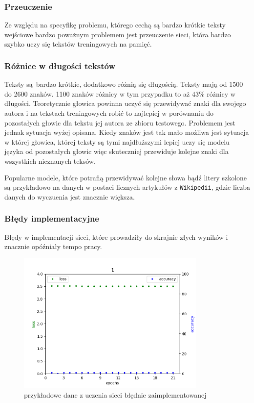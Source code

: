 \subsubsection{Przeuczenie}
Ze względu na specyfikę problemu, którego cechą są bardzo krótkie teksty wejściowe bardzo poważnym 
problemem jest przeuczenie sieci, która
bardzo szybko uczy się tekstów treningowych na pamięć. 

\subsubsection{Różnice w długości tekstów}
Teksty są bardzo krótkie, dodatkowo różnią się długością. Teksty mają od 1500 do 2600 znaków. 1100 znaków 
różnicy w tym przypadku to aż $43\%$ różnicy w długości. Teoretycznie głowica powinna uczyć się przewidywać znaki dla 
swojego autora i na tekstach treningowych robić to najlepiej w porównaniu do pozostałych głowic dla tekstu 
jej autora ze zbioru testowego. Problemem jest jednak sytuacja wyżej opisana. Kiedy znaków jest tak mało 
możliwa jest sytuacja w której głowica, której teksty są tymi najdłuższymi lepiej uczy się modelu języka od
pozostałych głowic więc skuteczniej przewiduje kolejne znaki dla wszystkich nieznanych teksów.

Popularne modele, które potrafią przewidywać kolejne słowa bądź litery szkolone są przykładowo na danych w postaci licznych 
artykułów z \texttt{Wikipedii}, gdzie liczba danych do wyczuenia jest znacznie większa.

\subsubsection{Błędy implementacyjne}
Błędy w implementacji sieci, które prowadziły do skrajnie złych wyników i znacznie opóźniały tempo pracy.
\begin{figure}[H]
	\centering
	\includegraphics[height=7cm]{./images/result1.png}
	\caption{przykładowe dane z uczenia sieci błędnie zaimplementowanej}
	\label{fig:test5}
	\end{figure}

